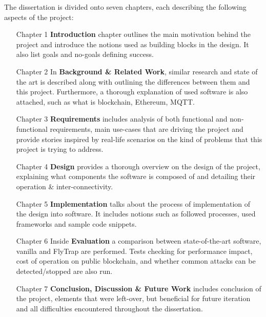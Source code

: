 The dissertation is divided onto seven chapters, each describing the following aspects of the project:
\begin{itemize}[leftmargin=4.5em]
  \item[Chapter 1] \textbf{Introduction} chapter outlines the main motivation behind the project and introduce the notions used as building blocks in the design. It also list goals and no-goals defining success.
  \item[Chapter 2] In \textbf{Background \& Related Work}, similar research and state of the art is described along with outlining the differences between them and this project. Furthermore, a thorough explanation of used software is also attached, such as what is blockchain, Ethereum, MQTT. 
  \item[Chapter 3] \textbf{Requirements} includes analysis of both functional and non-functional requirements, main use-cases that are driving the project and provide stories inspired by real-life scenarios on the kind of problems that this project is trying to address.
  \item[Chapter 4] \textbf{Design} provides a thorough overview on the design of the project, explaining what components the software is composed of and detailing their operation \& inter-connectivity.
  \item[Chapter 5] \textbf{Implementation} talks about the process of implementation of the design into software. It includes notions such as followed processes, used frameworks and sample code snippets.
  \item[Chapter 6] Inside \textbf{Evaluation} a comparison between state-of-the-art software, vanilla and FlyTrap are performed. Tests checking for performance impact, cost of operation on public blockchain, and whether common attacks can be detected/stopped are also run.
  \item[Chapter 7] \textbf{Conclusion, Discussion \& Future Work} includes conclusion of the project, elements that were left-over, but beneficial for future iteration and all difficulties encountered throughout the dissertation.
\end{itemize}

